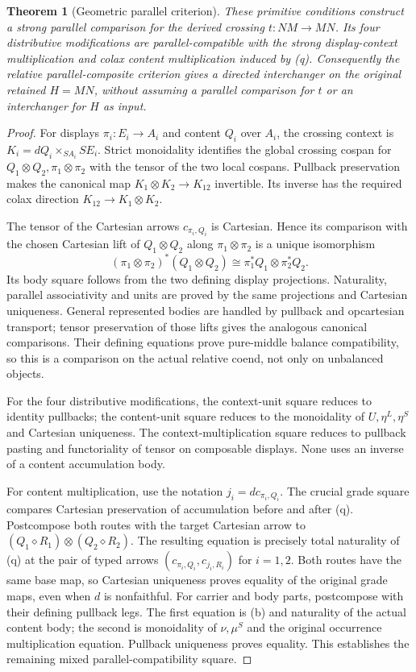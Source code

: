 \documentclass[11pt]{article}
\newtheorem{theorem}{Theorem}
\begin{document}
\begin{theorem}[Geometric parallel criterion]
These primitive conditions construct a strong parallel comparison for the derived crossing $t:NM\to MN$. Its four distributive modifications are parallel-compatible with the strong display-context multiplication and colax content multiplication induced by (q). Consequently the relative parallel-composite criterion gives a directed interchanger on the original retained $H=MN$, without assuming a parallel comparison for $t$ or an interchanger for $H$ as input.
\end{theorem}
\begin{proof}
For displays $\pi_i:E_i\to A_i$ and content $Q_i$ over $A_i$, the crossing context is $K_i=dQ_i\times_{SA_i}SE_i$. Strict monoidality identifies the global crossing cospan for $Q_1\otimes Q_2,\pi_1\otimes\pi_2$ with the tensor of the two local cospans. Pullback preservation makes the canonical map $K_1\otimes K_2\to K_{12}$ invertible. Its inverse has the required colax direction $K_{12}\to K_1\otimes K_2$.

The tensor of the Cartesian arrows $c_{\pi_i,Q_i}$ is Cartesian. Hence its comparison with the chosen Cartesian lift of $Q_1\otimes Q_2$ along $\pi_1\otimes\pi_2$ is a unique isomorphism
\[
 (\pi_1\otimes\pi_2)^*(Q_1\otimes Q_2)
 \cong \pi_1^*Q_1\otimes\pi_2^*Q_2.
\]
Its body square follows from the two defining display projections. Naturality, parallel associativity and units are proved by the same projections and Cartesian uniqueness. General represented bodies are handled by pullback and opcartesian transport; tensor preservation of those lifts gives the analogous canonical comparisons. Their defining equations prove pure-middle balance compatibility, so this is a comparison on the actual relative coend, not only on unbalanced objects.

For the four distributive modifications, the context-unit square reduces to identity pullbacks; the content-unit square reduces to the monoidality of $U,\eta^L,\eta^S$ and Cartesian uniqueness. The context-multiplication square reduces to pullback pasting and functoriality of tensor on composable displays. None uses an inverse of a content accumulation body.

For content multiplication, use the notation $j_i=d c_{\pi_i,Q_i}$. The crucial grade square compares Cartesian preservation of accumulation before and after (q). Postcompose both routes with the target Cartesian arrow to $(Q_1\diamond R_1)\otimes(Q_2\diamond R_2)$. The resulting equation is precisely total naturality of (q) at the pair of typed arrows
$(c_{\pi_i,Q_i},c_{j_i,R_i})$ for $i=1,2$. Both routes have the same base map, so Cartesian uniqueness proves equality of the original grade maps, even when $d$ is nonfaithful. For carrier and body parts, postcompose with their defining pullback legs. The first equation is (b) and naturality of the actual content body; the second is monoidality of $\nu,\mu^S$ and the original occurrence multiplication equation. Pullback uniqueness proves equality. This establishes the remaining mixed parallel-compatibility square.


\end{proof}
\end{document}
